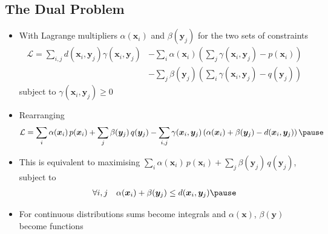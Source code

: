 
\begin{slide}
  \section[-1]{The Dual Problem}


\begin{PauseHighLight}
  \begin{itemize}\footnotesize
  \item With Lagrange multipliers $\alpha(\bm{x}_i)$ and $\beta(\bm{y}_j)$ for
    the two sets of constraints
    \begin{align*}
      \mathcal{L} = \sum_{i,j} d(\bm{x}_i,\bm{y}_j)
      \gamma(\bm{x}_i,\bm{y}_j)
      &- \sum_i \alpha(\bm{x}_i) \left( \sum_j \gamma(\bm{x}_i,\bm{y}_j) -p(\bm{x}_i)\right)\\
      &- \sum_j \beta(\bm{y}_j) \left( \sum_i \gamma(\bm{x}_i,\bm{y}_j) -q(\bm{y}_j)\right)
    \end{align*}
    subject to $\gamma(\bm{x}_i,\bm{y}_j)\geq 0$\pauseb
  \item Rearranging
    \begin{align*}
      \mathcal{L} = \sum_i \alpha(\bm{x}_i)\,p(\bm{x}_i) + \sum_j \beta(\bm{y}_j)\,q(\bm{y}_j)
      -\sum_{i,j} \gamma(\bm{x}_i,\bm{y}_j)\left( \alpha(\bm{x}_i) + \beta(\bm{y}_j) -
      d(\bm{x}_i,\bm{y}_j)\right)\pause
    \end{align*}
  \item This is equivalent to maximising $\sum_i \alpha(\bm{x}_i)\,p(\bm{x}_i) +
    \sum_j \beta(\bm{y}_j)\,q(\bm{y}_j)$, subject to
    \begin{align*}
      \forall i,j \quad \alpha(\bm{x}_i) + \beta(\bm{y}_j) \leq d(\bm{x}_i,\bm{y}_j)\pause
    \end{align*}
  \item For continuous distributions sums become integrals and
    $\alpha(\bm{x})$, $\beta(\bm{y})$ become functions\pause
  \end{itemize}
\end{PauseHighLight}

\end{slide}


